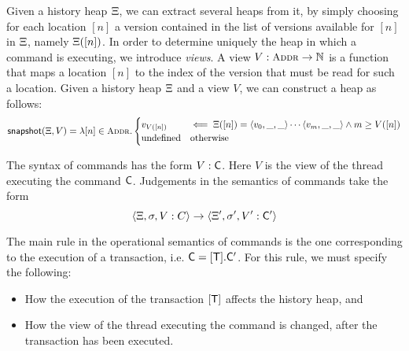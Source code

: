 \documentclass[a4paper,UKenglish]{article}%
\theoremstyle{plain}
\begin{document}
Given a history heap $\Xi$, we can extract several heaps 
from it, by simply choosing for each location $[n]$ a version 
contained in the list of versions available for $[n]$ in $\Xi$, 
namely $\Xi([n])$. 
In order to determine uniquely the heap in which a command 
is executing, we introduce \emph{views}. A view $V : \Addr \rightarrow \mathbb{N}$ is 
a function that maps a location $[n]$ to the index of the version 
that must be read for such a location. Given a history heap $\Xi$ and a 
view $V$, we can construct a heap as follows:  
\[
\snapshot(\hh, V) = \lambda [n] \in \Addr. 
\begin{cases}
v_{V([n])} &\impliedby \hh([n]) = \langle v_0, \_ , \_ \rangle \cdots \langle v_{m}, \_, \_ \rangle \wedge m \geq V([n])\\
\text{undefined} & \text{otherwise}
\end{cases}
\]

The syntax of commands has the form $V : \mathsf{C}$. Here $V$ is the view of the thread executing 
the command $\mathsf{C}$. 
Judgements in the semantics of commands take the form 
\[ 
\langle \Xi, \sigma, V: C \rangle \rightarrow \langle \Xi', \sigma', V': \mathsf{C}' \rangle
\]

The main rule in the operational semantics of commands is the one corresponding 
to the execution of a transaction, i.e. $\mathsf{C} = [\mathsf{T}].\mathsf{C}'$. For this rule, we must specify the following: 
\begin{itemize}
\item How the execution of the transaction $[\mathsf{T}]$ affects the history heap, and 
\item How the view of the thread executing the command is changed, after the transaction 
has been executed. 
\end{itemize}
\end{document}
